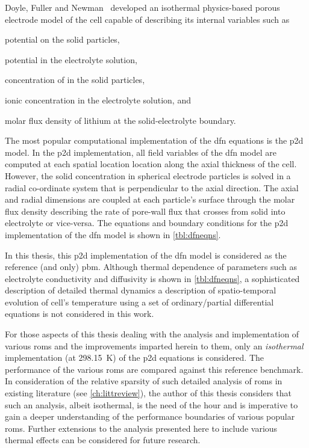 Doyle,  Fuller and  Newman~\cite{Doyle1993,Fuller1994}  developed an  isothermal
physics-based  porous electrode  model of  the  cell capable  of describing  its
internal variables such as
\begin{enumerate*}[label=\itshape\alph*\upshape)]
    \item potential on the solid particles,
    \item potential in the electrolyte solution,
    \item concentration of  in the solid particles,
    \item ionic concentration in the electrolyte solution, and
    \item molar flux density of lithium at the solid-electrolyte boundary.
\end{enumerate*}
The most popular computational implementation  of the \gls{dfn} equations is the
\gls{p2d} model.  In the  \gls{p2d} implementation, all  field variables  of the
\gls{dfn} model are  computed at each spatial location location  along the axial
thickness of the  cell. However, the solid concentration  in spherical electrode
particles is solved in a radial  co-ordinate system that is perpendicular to the
axial direction. The axial and radial  dimensions are coupled at each particle's
surface through  the molar flux  density describing  the rate of  pore-wall flux
that  crosses from  solid  into  electrolyte or  vice-versa.  The equations  and
boundary conditions for  the \gls{p2d} implementation of the  \gls{dfn} model is
shown in \cref{tbl:dfneqns}.



In  this  thesis,  this  \gls{p2d}  implementation of  the  \gls{dfn}  model  is
considered as  the reference (and  only) \gls{pbm}. Although  thermal dependence
of  parameters  such  as  electrolyte  conductivity  and  diffusivity  is  shown
in \cref{tbl:dfneqns}, a sophisticated description  of detailed thermal dynamics
\ie{} a description  of spatio-temporal evolution of cell's  temperature using a
set of ordinary/partial  differential equations is not considered  in this work.

For those aspects of this thesis dealing with the analysis and implementation of
various  \glspl{rom} and  the  improvements  imparted herein  to  them, only  an
\emph{isothermal}  implementation  (at  \SI{298.15}{\kelvin}) of  the  \gls{p2d}
equations  is  considered.  The  performance  of  the  various  \glspl{rom}  are
compared  against this  reference benchmark.  In consideration  of the  relative
sparsity of  such detailed analysis  of \glspl{rom} in existing  literature (see
\cref{ch:littreview}),  the  author  of  this  thesis  considers  that  such  an
analysis, albeit isothermal, is  the need of the hour and  is imperative to gain
a  deeper  understanding  of  the  performance  boundaries  of  various  popular
\glspl{rom}.  Further  extensions to  the  analysis  presented here  to  include
various thermal effects can be considered for future research.

